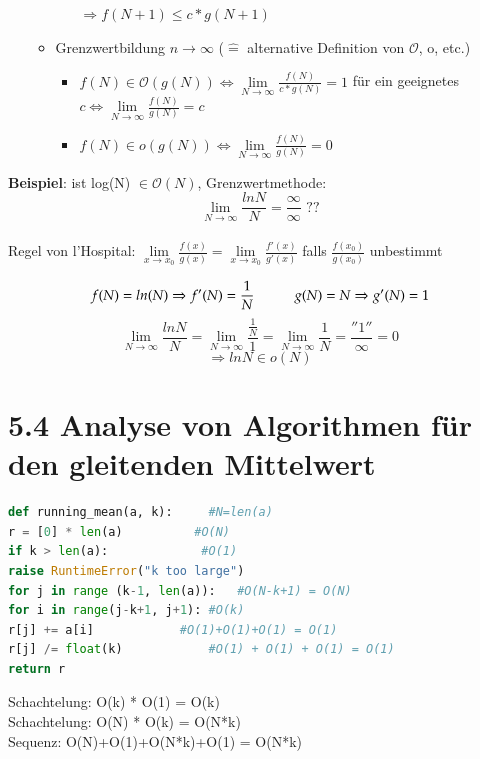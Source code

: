 \documentclass[11pt, fleqn]{scrreprt}
\begin{document}
\begin{itemize}
\begin{itemize}
\begin{enumerate}
				\hspace*{3cm} $\Rightarrow f(N+1) \leq c*g(N+1)$
			\end{enumerate}
			\item Grenzwertbildung $n \rightarrow \infty$ ($\widehat{=}$ alternative Definition von $\mathcal{O}$, o, etc.)
			\begin{itemize}[label={}]
				\item $f(N) \in \mathcal{O}(g(N)) \Leftrightarrow \lim\limits_{N \rightarrow \infty} \frac{f(N)}{c*g(N)} = 1$ für ein geeignetes $c \Leftrightarrow \lim\limits_{N \rightarrow \infty} \frac{f(N)}{g(N)} = c$
				\item $f(N) \in o(g(N)) \Leftrightarrow \lim\limits_{N \rightarrow \infty} \frac{f(N)}{g(N)} = 0$
			\end{itemize}
		\end{itemize}
	\end{itemize}

\textbf{Beispiel}: ist log(N) $\in \mathcal{O}(N)$, Grenzwertmethode:\\
\[\lim\limits_{N\rightarrow\infty} \frac{ln N}{N} = \frac{\infty}{\infty} \text{ ??} \]\\
Regel von l'Hospital: $\lim\limits_{x \rightarrow x_0} \frac{f(x)}{g(x)} = \lim\limits_{x \rightarrow x_0} \frac{f'(x)}{g'(x)}$ falls $\frac{f(x_0)}{g(x_0)}$ unbestimmt

\[f(N) = ln(N) \Rightarrow f'(N) = \frac{1}{N} \hspace*{1cm} g(N) = N \Rightarrow g'(N) = 1 \]
\[\lim_{N \rightarrow \infty} \frac{ln N}{N} = \lim_{N \rightarrow \infty} \frac{\frac{1}{N}}{1} = \lim_{N \rightarrow \infty} \frac{1}{N} =  \frac{''1''}{\infty} = 0  \]
\[ \Rightarrow ln N \in o(N) \]

\section*{5.4 Analyse von Algorithmen für den gleitenden Mittelwert}
\begin{lstlisting}[language=Python]
def running_mean(a, k):     #N=len(a)
r = [0] * len(a)          #O(N)
if k > len(a):             #O(1)
raise RuntimeError("k too large")
for j in range (k-1, len(a)):   #O(N-k+1) = O(N)
for i in range(j-k+1, j+1): #O(k)
r[j] += a[i]            #O(1)+O(1)+O(1) = O(1)
r[j] /= float(k)            #O(1) + O(1) + O(1) = O(1)
return r
\end{lstlisting}
Schachtelung: O(k) * O(1) = O(k) \\
Schachtelung: O(N) * O(k) = O(N*k) \\
Sequenz: O(N)+O(1)+O(N*k)+O(1) = O(N*k)\\
\end{document}
